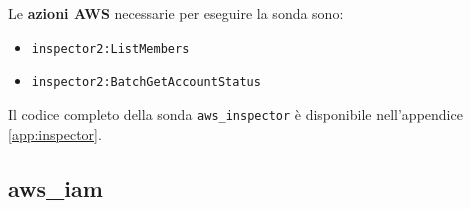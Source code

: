 \vspace{1em}

\noindent Le \textbf{azioni AWS} necessarie per eseguire la sonda sono:

\begin{itemize}
    \item \texttt{inspector2:ListMembers}
    \item \texttt{inspector2:BatchGetAccountStatus}
\end{itemize}

Il codice completo della sonda \texttt{aws\_inspector} è disponibile nell'appendice \ref{app:inspector}.

\subsection{aws\_iam}
\label{sec:iam}

